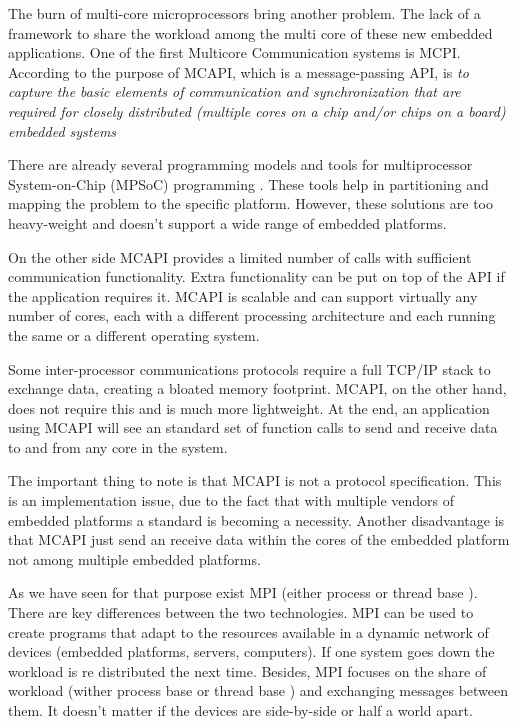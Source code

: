The burn of multi-core microprocessors bring another problem. The lack of a
framework to share the workload among the multi core of these new embedded
applications. One of the first Multicore Communication systems is MCPI.
According to \cite{MCAPI} the purpose of MCAPI, which is a message-passing API,
is \textit{to capture the basic elements of communication and synchronization
that are required for closely distributed (multiple cores on a chip and/or
chips on a board) embedded systems} 

There are already several programming models and tools for multiprocessor
System-on-Chip (MPSoC) programming \cite{Wolf} \cite{Matilainen}. These tools help  in
partitioning and mapping the problem to the specific platform. However, these
solutions are too heavy-weight and doesn't support a wide range of embedded
platforms. 

On the other side MCAPI provides a limited number of calls with sufficient
communication functionality. Extra functionality can be put on top of the API
if the application requires it. MCAPI is scalable and can support virtually any
number of cores, each with a different processing architecture and each running
the same or a different operating system.

Some inter-processor communications protocols \cite{Wolf} require a full TCP/IP
stack to exchange data, creating a bloated memory footprint. MCAPI, on the
other hand, does not require this and is much more lightweight. At the end, an
application using MCAPI will see an standard set of function calls to send and
receive data to and from any core in the system. 

The important thing to note is that MCAPI is not a protocol specification. This
is an implementation issue, due to the fact that with multiple vendors of
embedded platforms a standard is becoming a necessity. Another disadvantage is
that MCAPI just send an receive data within the cores of the embedded platform
not among multiple embedded platforms. 

As we have seen for that purpose exist MPI (either process or thread base ).
There are key differences between the two technologies. MPI can be used to
create programs that adapt to the resources available in a dynamic network of
devices (embedded platforms, servers, computers). If one system goes down the
workload is re distributed the next time. Besides, MPI focuses on the share of
workload (wither process base or thread base ) and exchanging messages between
them. It doesn't matter if the devices are side-by-side or half a world apart. 

